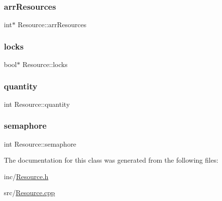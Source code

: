 \subsubsection{\texorpdfstring{arr\+Resources}{arrResources}}
{\footnotesize\ttfamily int$\ast$ Resource\+::arr\+Resources\hspace{0.3cm}{\ttfamily [private]}}

\hypertarget{class_resource_a65c93bcbd07aa8e6d9b49176725e8b26}{}\label{class_resource_a65c93bcbd07aa8e6d9b49176725e8b26} 
\subsubsection{\texorpdfstring{locks}{locks}}
{\footnotesize\ttfamily bool$\ast$ Resource\+::locks\hspace{0.3cm}{\ttfamily [private]}}

\hypertarget{class_resource_ad87427f8c53da8c83f4a00a2eef25f7f}{}\label{class_resource_ad87427f8c53da8c83f4a00a2eef25f7f} 
\subsubsection{\texorpdfstring{quantity}{quantity}}
{\footnotesize\ttfamily int Resource\+::quantity\hspace{0.3cm}{\ttfamily [private]}}

\hypertarget{class_resource_a108a01aac9b07a994e57cd50f283b4fa}{}\label{class_resource_a108a01aac9b07a994e57cd50f283b4fa} 
\subsubsection{\texorpdfstring{semaphore}{semaphore}}
{\footnotesize\ttfamily int Resource\+::semaphore\hspace{0.3cm}{\ttfamily [private]}}



The documentation for this class was generated from the following files\+:\begin{DoxyCompactItemize}
\item 
inc/\hyperlink{_resource_8h}{Resource.\+h}\item 
src/\hyperlink{_resource_8cpp}{Resource.\+cpp}\end{DoxyCompactItemize}
